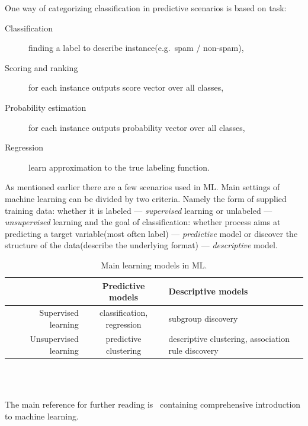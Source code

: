 \documentclass[12pt, a4paper, pdflatex, leqno]{report}
\begin{document}
One way of categorizing classification in predictive scenarios is based on task:
\begin{description}
\item[Classification] finding a label to describe instance(e.g.\ spam / non-spam),
\item[Scoring and ranking] for each instance outputs score vector over all classes,
\item[Probability estimation] for each instance outputs probability vector over all classes,
\item[Regression] learn approximation to the true labeling function.\\
\end{description}

As mentioned earlier there are a few scenarios used in ML. Main settings of machine learning can be divided by two criteria. Namely the form of supplied training data: whether it is labeled --- \emph{supervised} learning or unlabeled --- \emph{unsupervised} learning and the goal of classification: whether process aims at predicting a target variable(most often label) --- \emph{predictive} model or discover the structure of the data(describe the underlying format) --- \emph{descriptive} model.\\

\begin{table}[htbp]
  \begin{tabular}{ r | c p{5cm} }
                         & Predictive models          & Descriptive models \\
    \hline
    Supervised learning   & classification, regression & subgroup discovery \\
    Unsupervised learning & predictive clustering      & descriptive clustering, association rule discovery \\
  \end{tabular}~\\[0.1cm]
  \caption{Main learning models in ML.\label{fig:learning_models}}
\end{table}~\\

The main reference for further reading is~\citep{flach2012machine} containing comprehensive introduction to machine learning.
\end{document}
